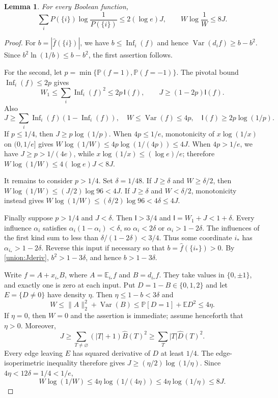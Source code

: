 \documentclass[11pt]{amsart}
\newtheorem{lemma}[theorem]{Lemma}
\theoremstyle{definition}
\theoremstyle{remark}
\newcommand{\E}{\mathbb E}
\renewcommand{\P}{\mathbb P}
\newcommand{\I}{\mathsf I}
\DeclareMathOperator{\Var}{Var}
\DeclareMathOperator{\Inf}{Inf}
\newcommand{\wh}[1]{\widehat{#1}}
\begin{document}
\begin{lemma}\label{union:smallmass}
For every Boolean function,
\[
 \sum_iP(\{i\})\log\frac1{P(\{i\})}\le2(\log e)J,
 \qquad
 W\log\frac1W\le8J.
\]
\end{lemma}
\begin{proof}
For $b=|\wh f(\{i\})|$, we have
$b\le\Inf_i(f)$ and hence
$\Var(d_if)\ge b-b^2$.
Since $b^2\ln(1/b)\le b-b^2$, the first assertion follows.

For the second, let $p=\min\{\P(f=1),\P(f=-1)\}$.
The pivotal bound $\Inf_i(f)\le2p$ gives
\[
 W_1\le\sum_i\Inf_i(f)^2\le2p\,\I(f),
 \qquad J\ge(1-2p)\I(f).
\]
Also
\[
 J\ge\sum_i\Inf_i(f)(1-\Inf_i(f)),
 \quad W\le\Var(f)\le4p,
 \quad \I(f)\ge2p\log(1/p).
\]
If $p\le1/4$, then $J\ge p\log(1/p)$.
When $4p\le1/e$, monotonicity of $x\log(1/x)$ on $(0,1/e]$ gives
$W\log(1/W)\le4p\log(1/(4p))\le4J$.
When $4p>1/e$, we have $J\ge p>1/(4e)$, while
$x\log(1/x)\le(\log e)/e$; therefore $W\log(1/W)\le4(\log e)J<8J$.

It remains to consider $p>1/4$.
Set $\delta=1/48$.
If $J\ge\delta$ and $W\ge\delta/2$, then
$W\log(1/W)\le(J/2)\log96<4J$.
If $J\ge\delta$ and $W<\delta/2$, monotonicity instead gives
$W\log(1/W)\le(\delta/2)\log96<4\delta\le4J$.

Finally suppose $p>1/4$ and $J<\delta$.
Then $\I>3/4$ and $\I=W_1+J<1+\delta$.
Every influence $\alpha_i$ satisfies
$\alpha_i(1-\alpha_i)<\delta$, so $\alpha_i<2\delta$ or $\alpha_i>1-2\delta$.
The influences of the first kind sum to less than
$\delta/(1-2\delta)<3/4$.
Thus some coordinate $i_*$ has $\alpha_{i_*}>1-2\delta$.
Reverse this input if necessary so that
$b=\wh f(\{i_*\})>0$.
By \eqref{union:Jderiv}, $b^2>1-3\delta$, and hence $b>1-3\delta$.

Write $f=A+x_{i_*}B$, where $A=\E_{i_*}f$ and $B=d_{i_*}f$.
They take values in $\{0,\pm1\}$, and exactly one is zero at each input.
Put $D=1-B\in\{0,1,2\}$ and let $E=\{D\ne0\}$ have density $\eta$.
Then $\eta\le1-b<3\delta$ and
\[
 W\le\|A\|_2^2+\Var(B)
   \le\P[D=1]+\E D^2\le4\eta.
\]
If $\eta=0$, then $W=0$ and the assertion is immediate; assume henceforth that $\eta>0$.
Moreover,
\[
 J\ge\sum_{T\ne\varnothing}(|T|+1)\wh B(T)^2
   \ge\sum_T|T|\wh D(T)^2.
\]
Every edge leaving $E$ has squared derivative of $D$ at least $1/4$.
The edge-isoperimetric inequality therefore gives
$J\ge(\eta/2)\log(1/\eta)$.
Since $4\eta<12\delta=1/4<1/e$,
\[
 W\log(1/W)\le4\eta\log(1/(4\eta))
             \le4\eta\log(1/\eta)\le8J.
\]
\end{proof}
\end{document}
